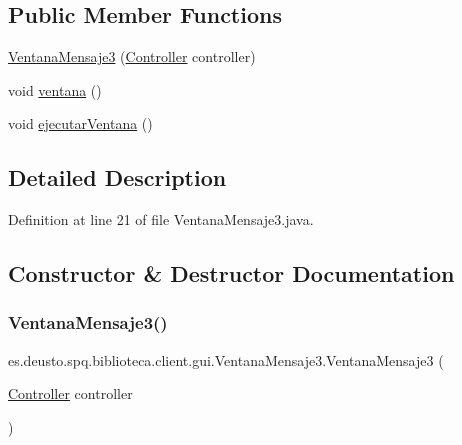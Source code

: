 \subsection*{Public Member Functions}
\begin{DoxyCompactItemize}
\item 
\mbox{\hyperlink{classes_1_1deusto_1_1spq_1_1biblioteca_1_1client_1_1gui_1_1_ventana_mensaje3_ad2b35ffb774851d61a99580701b9f91f}{Ventana\+Mensaje3}} (\mbox{\hyperlink{classes_1_1deusto_1_1spq_1_1biblioteca_1_1controller_1_1_controller}{Controller}} controller)
\item 
void \mbox{\hyperlink{classes_1_1deusto_1_1spq_1_1biblioteca_1_1client_1_1gui_1_1_ventana_mensaje3_a9e0e23158e6fcc44783491bf9d48e98d}{ventana}} ()
\item 
void \mbox{\hyperlink{classes_1_1deusto_1_1spq_1_1biblioteca_1_1client_1_1gui_1_1_ventana_mensaje3_ae5d8b8c6e4b454d53bae4af558a869e0}{ejecutar\+Ventana}} ()
\end{DoxyCompactItemize}


\subsection{Detailed Description}


Definition at line 21 of file Ventana\+Mensaje3.\+java.



\subsection{Constructor \& Destructor Documentation}
\mbox{\label{classes_1_1deusto_1_1spq_1_1biblioteca_1_1client_1_1gui_1_1_ventana_mensaje3_ad2b35ffb774851d61a99580701b9f91f}} 
\subsubsection{\texorpdfstring{Ventana\+Mensaje3()}{VentanaMensaje3()}}
{\footnotesize\ttfamily es.\+deusto.\+spq.\+biblioteca.\+client.\+gui.\+Ventana\+Mensaje3.\+Ventana\+Mensaje3 (\begin{DoxyParamCaption}\item[{\mbox{\hyperlink{classes_1_1deusto_1_1spq_1_1biblioteca_1_1controller_1_1_controller}{Controller}}}]{controller }\end{DoxyParamCaption})}

